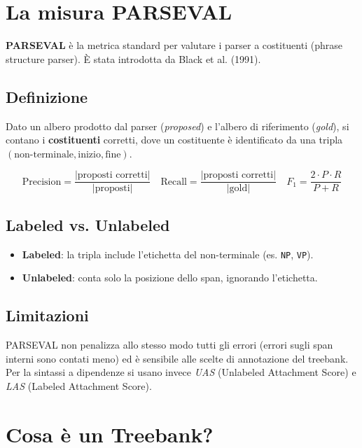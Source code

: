 \documentclass[12pt,a4paper]{article}
\begin{document}
\section{La misura PARSEVAL}

\textbf{PARSEVAL} è la metrica standard per valutare i parser a costituenti (phrase structure parser). È stata introdotta da Black et al. (1991).

\subsection{Definizione}
Dato un albero prodotto dal parser (\emph{proposed}) e l'albero di riferimento (\emph{gold}), si contano i \textbf{costituenti} corretti, dove un costituente è identificato da una tripla $(\text{non-terminale}, \text{inizio}, \text{fine})$.

\begin{defbox}
\[
\text{Precision} = \frac{|\text{proposti corretti}|}{|\text{proposti}|}
\quad
\text{Recall} = \frac{|\text{proposti corretti}|}{|\text{gold}|}
\quad
F_1 = \frac{2 \cdot P \cdot R}{P + R}
\]
\end{defbox}

\subsection{Labeled vs. Unlabeled}
\begin{itemize}[leftmargin=1.5em]
  \item \textbf{Labeled}: la tripla include l'etichetta del non-terminale (es. \texttt{NP}, \texttt{VP}).
  \item \textbf{Unlabeled}: conta solo la posizione dello span, ignorando l'etichetta.
\end{itemize}

\subsection{Limitazioni}
PARSEVAL non penalizza allo stesso modo tutti gli errori (errori sugli span interni sono contati meno) ed è sensibile alle scelte di annotazione del treebank. Per la sintassi a dipendenze si usano invece \emph{UAS} (Unlabeled Attachment Score) e \emph{LAS} (Labeled Attachment Score).

\section{Cosa è un Treebank?}
\end{document}
